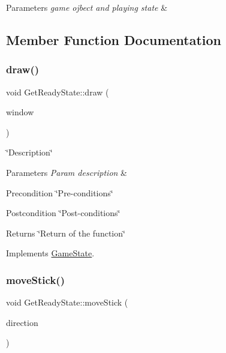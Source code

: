\begin{DoxyParams}{Parameters}
{\em game ojbect and playing state} & \\
\hline
\end{DoxyParams}


\subsection{Member Function Documentation}
\mbox{\label{classGetReadyState_a5e31ebfea8bddad603d4e25a6e2eea15}} 
\subsubsection{\texorpdfstring{draw()}{draw()}}
{\footnotesize\ttfamily void Get\+Ready\+State\+::draw (\begin{DoxyParamCaption}\item[{sf\+::\+Render\+Window \&}]{window }\end{DoxyParamCaption})\hspace{0.3cm}{\ttfamily [virtual]}}



\char`\"{}\+Description\char`\"{} 


\begin{DoxyParams}{Parameters}
{\em Param description} & \\
\hline
\end{DoxyParams}
\begin{DoxyPrecond}{Precondition}
\char`\"{}\+Pre-\/conditions\char`\"{} 
\end{DoxyPrecond}
\begin{DoxyPostcond}{Postcondition}
\char`\"{}\+Post-\/conditions\char`\"{} 
\end{DoxyPostcond}
\begin{DoxyReturn}{Returns}
\char`\"{}\+Return of the function\char`\"{} 
\end{DoxyReturn}


Implements \hyperlink{classGameState_a3131198be0dee9ad887fc48a02d626e3}{Game\+State}.

\mbox{\label{classGetReadyState_ab3073757951c1d757c8f4550bbb1c229}} 
\subsubsection{\texorpdfstring{move\+Stick()}{moveStick()}}
{\footnotesize\ttfamily void Get\+Ready\+State\+::move\+Stick (\begin{DoxyParamCaption}\item[{sf\+::\+Vector2i}]{direction }\end{DoxyParamCaption})\hspace{0.3cm}{\ttfamily [virtual]}}



